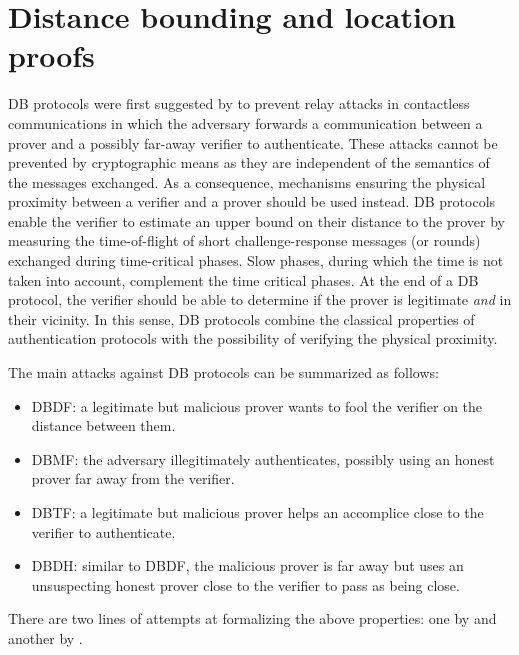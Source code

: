 \section{Distance bounding and location proofs}
\label{db-and-lp}
\Ac{DB} protocols were first suggested by \citet{DistanceBounding} to prevent relay attacks in contactless communications in which the adversary forwards a communication between a prover and a possibly far-away verifier to authenticate. 
These attacks cannot be prevented by cryptographic means as they are independent of the semantics of the messages exchanged.
As a consequence, mechanisms ensuring the physical proximity between a verifier and a prover should be used instead.
\Ac{DB} protocols enable the verifier to estimate an upper bound on their distance to the prover by measuring the time-of-flight of short challenge-response messages (or rounds) exchanged during time-critical phases. 
Slow phases, during which the time is not taken into account, complement the time critical phases.
At the end of a \Ac{DB} protocol, the verifier should be able to determine if the prover is legitimate \emph{and} in their vicinity.
In this sense, \Ac{DB} protocols combine the classical properties of authentication protocols with the possibility of verifying the physical proximity.

The main attacks against \ac{DB} protocols can be summarized as follows:
\begin{itemize}
  \item \Acf{DBDF}: a legitimate but malicious prover wants to fool the verifier on the distance between them.
  \item \Acf{DBMF}: the adversary illegitimately authenticates, possibly using an honest prover far away from the verifier.
  \item \Acf{DBTF}: a legitimate but malicious prover helps an accomplice close to the verifier to authenticate.
  \item \Acf{DBDH}: similar to \ac{DBDF}, the malicious prover is far away but uses an unsuspecting honest prover close to the verifier to pass as being close.
\end{itemize}
There are two lines of attempts at formalizing the above properties: one by \citet{DB-BMV} and another by \citet{DB-DFKO}.

